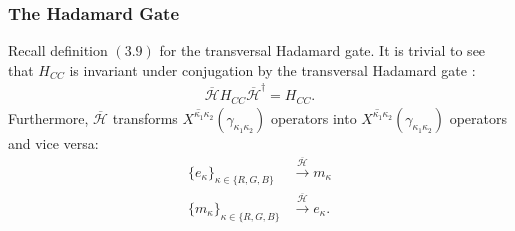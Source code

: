 \documentclass[12pt]{article}
\theoremstyle{definition}
\begin{document}
\subsubsection{The Hadamard Gate}
Recall definition $(3.9)$ for the transversal Hadamard gate. It is trivial to see that $H_{CC}$ is invariant under conjugation by the transversal Hadamard gate \cite{yoshida2015}:
    \begin{align}
        \overline{\mathcal{H}}H_{CC}\overline{\mathcal{H}}^\dagger = H_{CC}.
    \end{align}
Furthermore, $\overline{\mathcal{H}}$ transforms $\overline{X^{\kappa_1\kappa_2}}(\gamma_{\kappa_1\kappa_2})$ operators into $\overline{X^{\kappa_1\kappa_2}}(\gamma_{\kappa_1\kappa_2})$ operators and vice versa:
    \begin{align}
        \{e_\kappa\}_{\kappa\in\{R,G,B\}}&\xrightarrow{\overline{\mathcal{H}}}m_\kappa\\
        \{m_\kappa\}_{\kappa\in\{R,G,B\}}&\xrightarrow{\overline{\mathcal{H}}}e_\kappa.
    \end{align}
\end{document}
